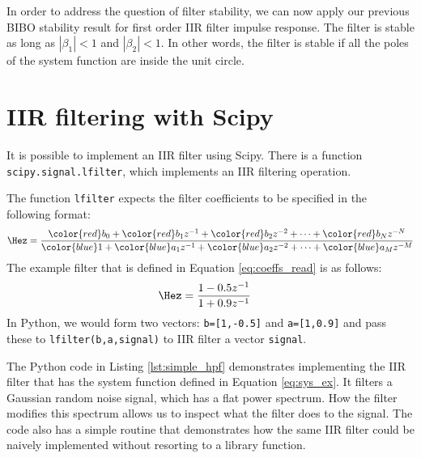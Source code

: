 In order to address the question of filter stability, we can now apply
our previous BIBO stability result for first order IIR filter impulse
response. The filter is stable as long as $|\beta_1|<1$ and
$|\beta_2|<1$. In other words, the filter is stable if all the
poles of the system function are inside the unit circle.

\section{IIR filtering with Scipy}

It is possible to implement an IIR filter using Scipy. There is a
function \verb|scipy.signal.lfilter|, which implements an IIR
filtering operation.

The function \verb|lfilter| expects the filter coefficients to be specified in the following format:
\begin{equation}
\Hez = \frac{{\color{red}b_0} + {\color{red}b_1} z^{-1} + {\color{red}b_2} z^{-2} + \cdots + {\color{red}b_N} z^{-N}}{{\color{blue}1} + {\color{blue}a_1} z^{-1} + {\color{blue}a_2} z^{-2} + \cdots + {\color{blue}a_M} z^{-M}}
\end{equation}
The example filter that is defined in Equation \ref{eq:coeffs_read} is as follows:
\begin{align}
\Hez &= \frac{1-0.5z^{-1}}{1+0.9 z^{-1}}
\label{eq:sys_ex}
\end{align}
In Python, we would form two vectors: {\color{red}\verb|b=[1,-0.5]|}
and {\color{blue}\verb|a=[1,0.9]|} and pass these to \verb|lfilter(b,a,signal)| to
IIR filter a vector \verb|signal|.


The Python code in Listing \ref{lst:simple_hpf} demonstrates
implementing the IIR filter that has the system function defined in
Equation \ref{eq:sys_ex}. It filters a Gaussian random noise signal,
which has a flat power spectrum. How the filter modifies this spectrum
allows us to inspect what the filter does to the signal. The code also
has a simple routine that demonstrates how the same IIR filter could be
naively implemented without resorting to a library function.


